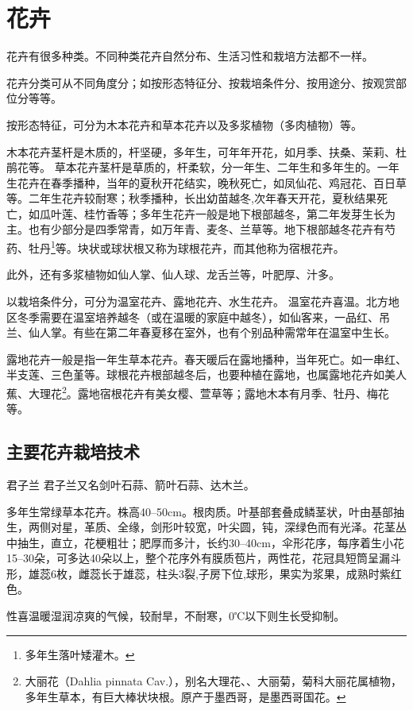 \documentclass{ctexbook}
\begin{document}
\chapter{花卉}
花卉有很多种类。不同种类花卉自然分布、生活习性和栽培方法都不一样。

花卉分类可从不同角度分；如按形态特征分、按栽培条件分、按用途分、按观赏部位分等等。

按形态特征，可分为木本花卉和草本花卉以及多浆植物（多肉植物）等。

木本花卉茎杆是木质的，杆坚硬，多年生，可年年开花，如月季、扶桑、茉莉、杜鹃花等。
草本花卉茎杆是草质的，杆柔软，分一年生、二年生和多年生的。一年生花卉在春季播种，当年的夏秋开花结实，晚秋死亡，如凤仙花、鸡冠花、百日草等。二年生花卉较耐寒；秋季播种，长出幼苗越冬,次年春天开花，夏秋结果死亡，如瓜叶莲、桂竹香等；多年生花卉一般是地下根部越冬，第二年发芽生长为主。也有少部分是四季常青，如万年青、麦冬、兰草等。地下根部越冬花卉有芍药、牡丹\footnote{多年生落叶矮灌木。}等。块状或球状根又称为球根花卉，而其他称为宿根花卉。

此外，还有多浆植物如仙人掌、仙人球、龙舌兰等，叶肥厚、汁多。

以栽培条件分，可分为温室花卉、露地花卉、水生花卉。
温室花卉喜温。北方地区冬季需要在温室培养越冬（或在温暖的家庭中越冬），如仙客来，一品红、吊兰、仙人掌。有些在第二年春夏移在室外，也有个别品种需常年在温室中生长。

露地花卉一般是指一年生草本花卉。春天暖后在露地播种，当年死亡。如一串红、半支莲、三色堇等。球根花卉根部越冬后，也要种植在露地，也属露地花卉如美人蕉、大理花\footnote{大丽花（Dahlia pinnata Cav.），别名大理花、、大丽菊，菊科大丽花属植物，多年生草本，有巨大棒状块根。原产于墨西哥，是墨西哥国花。}。露地宿根花卉有美女樱、萱草等；露地木本有月季、牡丹、梅花等。

\section{主要花卉栽培技术}
君子兰
君子兰又名剑叶石蒜、箭叶石蒜、达木兰。

多年生常绿草本花卉。株高40--50cm。根肉质。叶基部套叠成鳞茎状，叶由基部抽生，两侧对星，革质、全缘，剑形叶较宽，叶尖圆，钝，深绿色而有光泽。花茎丛中抽生，直立，花梗粗壮；肥厚而多汁，长约30--40cm，伞形花序，每序着生小花15--30朵，可多达40朵以上，整个花序外有膜质苞片，两性花，花冠具短筒呈漏斗形，雄蕊6枚，雌蕊长于雄蕊，柱头3裂,子房下位,球形，果实为浆果，成熟时紫红色。

性喜温暖湿润凉爽的气候，较耐旱，不耐寒，0℃以下则生长受抑制。
\end{document}
